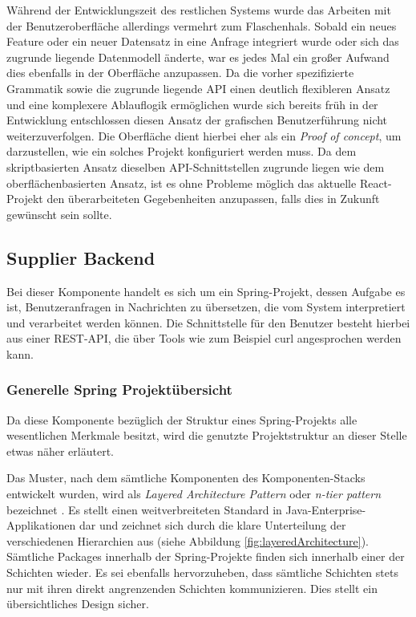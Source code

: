 Während der Entwicklungszeit des restlichen Systems wurde das Arbeiten mit der Benutzeroberfläche allerdings vermehrt zum Flaschenhals. Sobald ein neues Feature oder ein neuer Datensatz in eine Anfrage integriert wurde oder sich das zugrunde liegende Datenmodell änderte, war es jedes Mal ein großer Aufwand dies ebenfalls in der Oberfläche anzupassen. Da die vorher spezifizierte Grammatik sowie die zugrunde liegende API einen deutlich flexibleren Ansatz und eine komplexere Ablauflogik ermöglichen wurde sich bereits früh in der Entwicklung entschlossen diesen Ansatz der grafischen Benutzerführung nicht weiterzuverfolgen. Die Oberfläche dient hierbei eher als ein \emph{Proof of concept}, um darzustellen, wie ein solches Projekt konfiguriert werden muss. Da dem skriptbasierten Ansatz dieselben API-Schnittstellen zugrunde liegen wie dem oberflächenbasierten Ansatz, ist es ohne Probleme möglich das aktuelle React-Projekt den überarbeiteten Gegebenheiten anzupassen, falls dies in Zukunft gewünscht sein sollte.


\subsection{Supplier Backend}
Bei dieser Komponente handelt es sich um ein Spring-Projekt, dessen Aufgabe es ist, Benutzeranfragen in Nachrichten zu übersetzen, die vom System interpretiert und verarbeitet werden können. Die Schnittstelle für den Benutzer besteht hierbei aus einer REST-API, die über Tools wie zum Beispiel curl angesprochen werden kann.

\subsubsection{Generelle Spring Projektübersicht}
\label{ss:springProj}
Da diese Komponente bezüglich der Struktur eines Spring-Projekts alle wesentlichen Merkmale besitzt, wird die genutzte Projektstruktur an dieser Stelle etwas näher erläutert. 

Das Muster, nach dem sämtliche Komponenten des Komponenten-Stacks entwickelt wurden, wird als \emph{Layered Architecture Pattern} oder \emph{n-tier pattern} bezeichnet \cite{oreilly-layered-arch}. Es stellt einen weitverbreiteten Standard in Java-Enterprise-Applikationen dar und zeichnet sich durch die klare Unterteilung der verschiedenen Hierarchien aus (siehe Abbildung \ref{fig:layeredArchitecture}). Sämtliche Packages innerhalb der Spring-Projekte finden sich innerhalb einer der Schichten wieder. Es sei ebenfalls hervorzuheben, dass sämtliche Schichten stets nur mit ihren direkt angrenzenden Schichten kommunizieren. Dies stellt ein übersichtliches Design sicher.
\newpage

